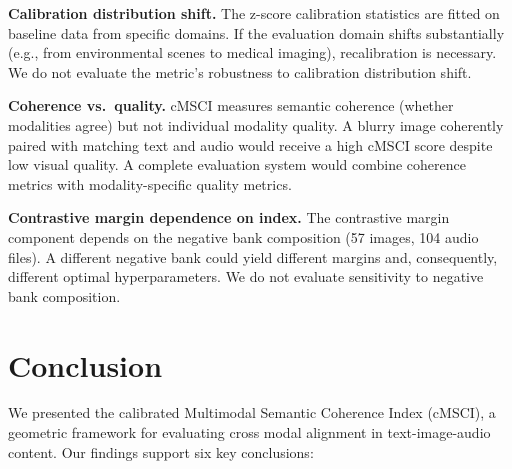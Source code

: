 \textbf{Calibration distribution shift.} The z-score calibration statistics are fitted on baseline data from specific domains. If the evaluation domain shifts substantially (e.g., from environmental scenes to medical imaging), recalibration is necessary. We do not evaluate the metric's robustness to calibration distribution shift.

\textbf{Coherence vs.\ quality.} cMSCI measures semantic coherence (whether modalities agree) but not individual modality quality. A blurry image coherently paired with matching text and audio would receive a high cMSCI score despite low visual quality. A complete evaluation system would combine coherence metrics with modality-specific quality metrics.

\textbf{Contrastive margin dependence on index.} The contrastive margin component depends on the negative bank composition (57 images, 104 audio files). A different negative bank could yield different margins and, consequently, different optimal hyperparameters. We do not evaluate sensitivity to negative bank composition.

\section{Conclusion}\label{sec:conclusion}

We presented the calibrated Multimodal Semantic Coherence Index (cMSCI), a geometric framework for evaluating cross modal alignment in text-image-audio content. Our findings support six key conclusions:

